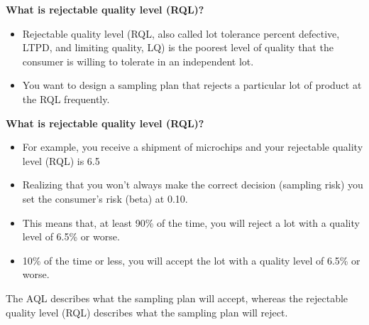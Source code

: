 \documentclass{beamer}
\begin{document}
\begin{frame}
	
	
	\noindent \textbf{What is rejectable quality level (RQL)?}
	
	\begin{itemize}
		\item Rejectable quality level (RQL, also called lot tolerance percent defective, LTPD, and limiting quality, LQ) is the poorest level of quality that the consumer is willing to tolerate in an independent lot.
		\item  You want to design a sampling plan that rejects a particular lot of product at the RQL frequently.
	\end{itemize}
	
	
\end{frame}

\begin{frame}
	
	
	\noindent \textbf{What is rejectable quality level (RQL)?}
	
	\begin{itemize}
		\item For example, you receive a shipment of microchips and your rejectable quality level (RQL) is 6.5%
		\item 
		Realizing that you won't always make the correct decision (sampling risk) you set the consumer's risk (beta) at 0.10. 
		\item 
		This means that, at least 90\% of the time, you will reject a lot with a quality level of 6.5\% or worse. 
		\item 
		10\% of the time or less, you will accept the lot with a quality level of 6.5\% or worse.
	\end{itemize}
\end{frame}
\begin{frame}
	\large
	
	\begin{framed}
		
		The AQL describes what the sampling plan will accept, whereas the rejectable quality level (RQL) describes what the sampling plan will reject.
		
	\end{framed}
	
\end{frame}
\end{document}
